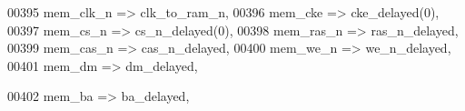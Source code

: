 \begin{DoxyCode}
00395                             mem_clk_n       => clk_to_ram_n,          
00396                             mem_cke         => cke_delayed\textcolor{vhdlchar}{(}\textcolor{vhdllogic}{0}\textcolor{vhdlchar}{)},        
00397                             mem_cs_n        => cs_n_delayed\textcolor{vhdlchar}{(}\textcolor{vhdllogic}{0}\textcolor{vhdlchar}{)},       
00398                             mem_ras_n       => ras_n_delayed,         
00399                             mem_cas_n       => cas_n_delayed,         
00400                             mem_we_n        => we_n_delayed,          
00401                             mem_dm          => dm_delayed,                                                 
        
00402                             mem_ba          => ba_delayed,                                                 
           

\end{DoxyCode}
